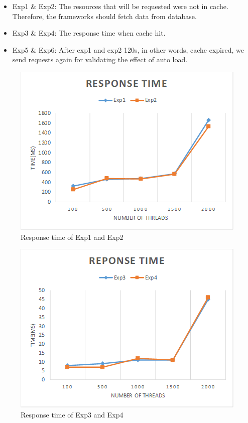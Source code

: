 \documentclass{singlecol-new}
\theoremstyle{TH}{
\newtheorem{lemma}{Lemma}
\newtheorem{theorem}[lemma]{Theorem}
\newtheorem{corrolary}[lemma]{Corrolary}
\newtheorem{conjecture}[lemma]{Conjecture}
\newtheorem{proposition}[lemma]{Proposition}
\newtheorem{claim}[lemma]{Claim}
\newtheorem{stheorem}[lemma]{Wrong Theorem}
}
\theoremstyle{THrm}{
\newtheorem{definition}{Definition}[section]
\newtheorem{question}{Question}[section]
\newtheorem{remark}{Remark}
\newtheorem{scheme}{Scheme}
}
\theoremstyle{THhit}{
\newtheorem{case}{Case}[section]
}
\begin{document}
\begin{itemize}
    \item Exp1 \& Exp2: The resources that will be requested were not in cache. Therefore, the frameworks should fetch data from database.
    \item Exp3 \& Exp4: The response time when cache hit.
    \item Exp5 \& Exp6: After exp1 and exp2 120s, in other words, cache expired, we send requests again for validating the effect of auto load.
\end{itemize}

\begin{figure} [htb]
    \centering
    \includegraphics[width=1\linewidth]{img/exp1-2.png}
    \caption{Response time of Exp1 and Exp2}
    \label{exp1-2}
\end{figure}

\begin{figure} [htb]
    \centering
    \includegraphics[width=1\linewidth]{img/exp3-4.png}
    \caption{Response time of Exp3 and Exp4}
    \label{exp3-4}
\end{figure}
\end{document}
